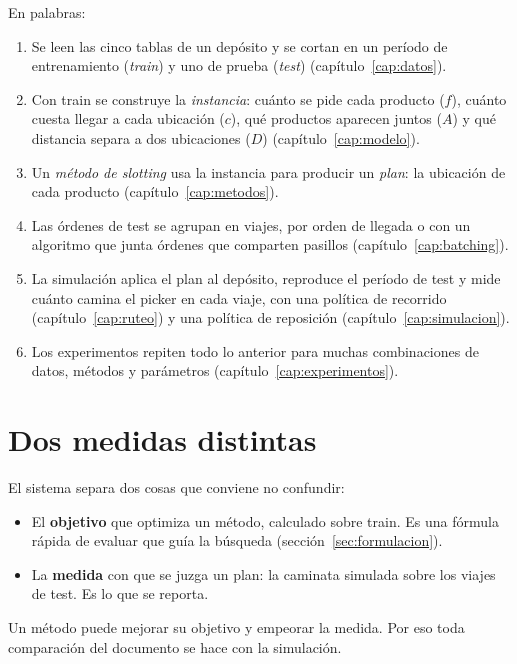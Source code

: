 \documentclass[11pt,a4paper,oneside]{report}
\begin{document}
En palabras:

\begin{enumerate}
  \item Se leen las cinco tablas de un depósito y se cortan en un período de entrenamiento
        (\emph{train}) y uno de prueba (\emph{test}) (capítulo~\ref{cap:datos}).
  \item Con train se construye la \emph{instancia}: cuánto se pide cada producto ($f$), cuánto
        cuesta llegar a cada ubicación ($c$), qué productos aparecen juntos ($A$) y qué
        distancia separa a dos ubicaciones ($D$) (capítulo~\ref{cap:modelo}).
  \item Un \emph{método de slotting} usa la instancia para producir un \emph{plan}: la
        ubicación de cada producto (capítulo~\ref{cap:metodos}).
  \item Las órdenes de test se agrupan en viajes, por orden de llegada o con un algoritmo que
        junta órdenes que comparten pasillos (capítulo~\ref{cap:batching}).
  \item La simulación aplica el plan al depósito, reproduce el período de test y mide cuánto
        camina el picker en cada viaje, con una política de recorrido
        (capítulo~\ref{cap:ruteo}) y una política de reposición (capítulo~\ref{cap:simulacion}).
  \item Los experimentos repiten todo lo anterior para muchas combinaciones de datos, métodos
        y parámetros (capítulo~\ref{cap:experimentos}).
\end{enumerate}

\section{Dos medidas distintas}

El sistema separa dos cosas que conviene no confundir:

\begin{itemize}
  \item El \textbf{objetivo} que optimiza un método, calculado sobre train. Es una fórmula
        rápida de evaluar que guía la búsqueda (sección~\ref{sec:formulacion}).
  \item La \textbf{medida} con que se juzga un plan: la caminata simulada sobre los viajes de
        test. Es lo que se reporta.
\end{itemize}

Un método puede mejorar su objetivo y empeorar la medida. Por eso toda comparación del
documento se hace con la simulación.
\end{document}
